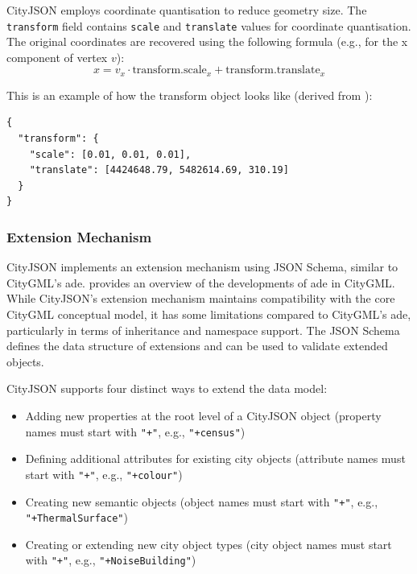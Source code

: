 CityJSON employs coordinate quantisation to reduce geometry size. The \texttt{transform} field contains \texttt{scale} and \texttt{translate} values for coordinate quantisation. The original coordinates are recovered using the following formula (e.g., for the x component of vertex $v$):
\begin{equation}
  \label{eq:cityjson:coordinate_quantisation}
  x = v_x \cdot \text{transform.scale}_x + \text{transform.translate}_x
\end{equation}

This is an example of how the transform object looks like (derived from \citet{ledoux_2019}):
\begin{lstlisting}
{
  "transform": {
    "scale": [0.01, 0.01, 0.01],
    "translate": [4424648.79, 5482614.69, 310.19]
  }
}
\end{lstlisting}

\subsubsection{Extension Mechanism}
\label{rw:cityjson:extension_mechanism}

CityJSON implements an extension mechanism using JSON Schema, similar to CityGML's \ac{ade}.
\citet{fillip_2018} provides an overview of the developments of \ac{ade} in CityGML. While CityJSON's extension mechanism maintains compatibility with the core CityGML conceptual model, it has some limitations compared to CityGML's \ac{ade}, particularly in terms of inheritance and namespace support.
The JSON Schema defines the data structure of extensions and can be used to validate extended objects.

CityJSON supports four distinct ways to extend the data model:

\begin{itemize}
  \item Adding new properties at the root level of a CityJSON object (property names must start with \texttt{"+"}, e.g., \texttt{"+census"})
  \item Defining additional attributes for existing city objects (attribute names must start with \texttt{"+"}, e.g., \texttt{"+colour"})
  \item Creating new semantic objects (object names must start with \texttt{"+"}, e.g., \texttt{"+ThermalSurface"})
  \item Creating or extending new city object types (city object names must start with \texttt{"+"}, e.g., \texttt{"+NoiseBuilding"})
\end{itemize}

